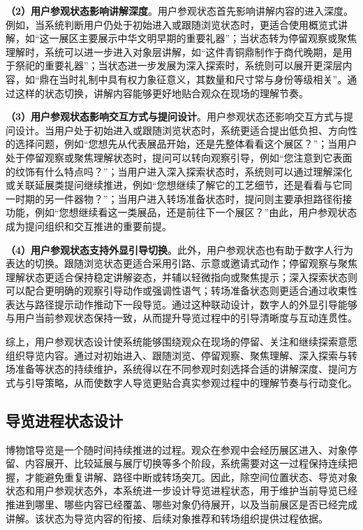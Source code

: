 \textbf{（2）用户参观状态影响讲解深度}。用户参观状态首先影响讲解内容的进入深度。例如，当系统判断用户仍处于初始进入或跟随浏览状态时，更适合使用概览式讲解，如“这一展区主要展示中华文明早期的重要礼器”；当状态转为停留观察或聚焦理解时，系统可以进一步进入对象层讲解，如“这件青铜鼎制作于商代晚期，是用于祭祀的重要礼器”；当状态进一步发展为深入探索时，系统则可以展开更深层内容，如“鼎在当时礼制中具有权力象征意义，其数量和尺寸常与身份等级相关”。通过这样的状态切换，讲解内容能够更好地贴合观众在现场的理解节奏。

\textbf{（3）用户参观状态影响交互方式与提问设计}。用户参观状态还影响交互方式与提问设计。当用户处于初始进入或跟随浏览状态时，系统更适合提出低负担、方向性的选择问题，例如“您想先从代表展品开始，还是先整体看看这个展区？”；当用户处于停留观察或聚焦理解状态时，提问可以转向观察引导，例如“您注意到它表面的纹饰有什么特点吗？”；当用户进入深入探索状态时，系统则可以通过理解深化或关联延展类提问继续推进，例如“您想继续了解它的工艺细节，还是看看与它同一时期的另一件器物？”；当用户进入转场准备状态时，提问则主要承担路径衔接功能，例如“您想继续看这一类展品，还是前往下一个展区？”由此，用户参观状态成为提问组织和交互推进的重要前提。

\textbf{（4）用户参观状态支持外显引导切换}。此外，用户参观状态也有助于数字人行为表达的切换。跟随浏览状态更适合采用引路、示意或邀请式动作；停留观察与聚焦理解状态更适合保持稳定讲解姿态，并辅以轻微指向或聚焦提示；深入探索状态则可以配合更明确的观察引导动作或强调性语气；转场准备状态则更适合通过收束性表达与路径提示动作推动下一段导览。通过这种联动设计，数字人的外显引导能够与用户当前参观状态保持一致，从而提升导览过程中的引导清晰度与互动连贯性。

综上，用户参观状态设计使系统能够围绕观众在现场的停留、关注和继续探索意愿组织导览内容。通过对初始进入、跟随浏览、停留观察、聚焦理解、深入探索与转场准备等状态的持续维护，系统得以在不同参观时刻选择合适的讲解深度、提问方式与引导策略，从而使数字人导览更贴合真实参观过程中的理解节奏与行动变化。

\subsection{导览进程状态设计}
博物馆导览是一个随时间持续推进的过程。观众在参观中会经历展区进入、对象停留、内容展开、比较延展与展厅切换等多个阶段，系统需要对这一过程保持连续把握，才能避免重复讲解、路径中断或转场突兀。因此，除空间位置状态、导览对象状态和用户参观状态外，本系统进一步设计导览进程状态，用于维护当前导览已经推进到哪里、哪些内容已经覆盖、哪些对象仍待展开，以及当前展区是否已经完成讲解。该状态为导览内容的衔接、后续对象推荐和转场组织提供过程依据。


